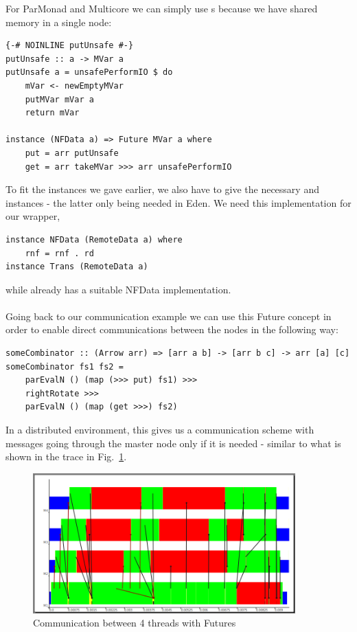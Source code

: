 For ParMonad and Multicore we can simply use s because we have shared memory in a single node:
\begin{lstlisting}[frame=htrbl]
{-# NOINLINE putUnsafe #-}
putUnsafe :: a -> MVar a
putUnsafe a = unsafePerformIO $ do
    mVar <- newEmptyMVar
    putMVar mVar a
    return mVar

instance (NFData a) => Future MVar a where
    put = arr putUnsafe
    get = arr takeMVar >>> arr unsafePerformIO
\end{lstlisting}
To fit the  instances we gave earlier, we also have to give the necessary  and  instances - the latter only being needed in Eden.
We need this implementation for our  wrapper,
\begin{lstlisting}[frame=htrbl]
instance NFData (RemoteData a) where
    rnf = rnf . rd
instance Trans (RemoteData a)
\end{lstlisting}
while  already has a suitable NFData implementation.
\\\\
Going back to our communication example we can use this Future concept in order to enable direct communications between the nodes in the following way:
\begin{lstlisting}[frame=htrbl]
someCombinator :: (Arrow arr) => [arr a b] -> [arr b c] -> arr [a] [c]
someCombinator fs1 fs2 =
	parEvalN () (map (>>> put) fs1) >>>
	rightRotate >>>
	parEvalN () (map (get >>>) fs2)
\end{lstlisting}
In a distributed environment, this gives us a communication scheme with messages going through the master node only if it is needed - similar to what is shown in the trace in Fig.~\ref{fig:withFutures}.
\begin{figure}[ht]
	\centering
	\includegraphics[width=0.9\textwidth]{images/withFutures}
	\caption[with Futures]{Communication between 4 threads with Futures}
	\label{fig:withFutures}
\end{figure}